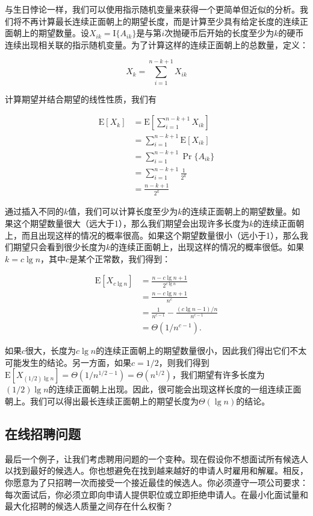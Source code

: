 \documentclass[lang=cn,newtx,10pt,scheme=chinese]{elegantbook}
\begin{document}
与生日悖论一样，我们可以使用指示随机变量来获得一个更简单但近似的分析。我们将不再计算最长连续正面朝上的期望长度，而是计算至少具有给定长度的连续正面朝上的期望数量。设$X_{ik}=\mathrm{I}\{A_{ik}\}$是与第$i$次抛硬币后开始的长度至少为$k$的硬币连续出现相关联的指示随机变量。为了计算这样的连续正面朝上的总数量，定义：

$$
X_k=\sum_{i=1}^{n-k+1} X_{i k}
$$

计算期望并结合期望的线性性质，我们有

$$
\begin{aligned}
\mathrm{E}[X_k] & =\mathrm{E}[\sum_{i=1}^{n-k+1} X_{i k}] \\
& =\sum_{i=1}^{n-k+1} \mathrm{E}[X_{i k}] \\
& =\sum_{i=1}^{n-k+1} \operatorname{Pr}\{A_{i k}\} \\
& =\sum_{i=1}^{n-k+1} \frac{1}{2^k} \\
& =\frac{n-k+1}{2^k}
\end{aligned}
$$

通过插入不同的$k$值，我们可以计算长度至少为$k$的连续正面朝上的期望数量。如果这个期望数量很大（远大于1），那么我们期望会出现许多长度为$k$的连续正面朝上，而且出现这样的情况的概率很高。如果这个期望数量很小（远小于1），那么我们期望只会看到很少长度为$k$的连续正面朝上，出现这样的情况的概率很低。如果$k=c\lg n$，其中$c$是某个正常数，我们得到：

$$
\begin{aligned}
\mathrm{E}[X_{c \lg n}] & =\frac{n-c \lg n+1}{2^{c \lg n}} \\
& =\frac{n-c \lg n+1}{n^c} \\
& =\frac{1}{n^{c-1}}-\frac{(c \lg n-1) / n}{n^{c-1}} \\
& =\Theta(1 / n^{c-1}) .
\end{aligned}
$$

如果$c$很大，长度为$c\lg n$的连续正面朝上的期望数量很小，因此我们得出它们不太可能发生的结论。另一方面，如果$c=1/2$，则我们得到$\mathrm{E}[X_{(1/2)\lg n}]=\Theta(1/n^{1/2-1})=\Theta(n^{1/2})$，我们期望有许多长度为$(1/2)\lg n$的连续正面朝上出现。因此，很可能会出现这样长度的一组连续正面朝上。我们可以得出最长连续正面朝上的期望长度为$\Theta(\lg n)$的结论。

\subsection{在线招聘问题}

最后一个例子，让我们考虑聘用问题的一个变种。现在假设你不想面试所有候选人以找到最好的候选人。你也想避免在找到越来越好的申请人时雇用和解雇。相反，你愿意为了只招聘一次而接受一个接近最佳的候选人。你必须遵守一项公司要求：每次面试后，你必须立即向申请人提供职位或立即拒绝申请人。在最小化面试量和最大化招聘的候选人质量之间存在什么权衡？
\end{document}
